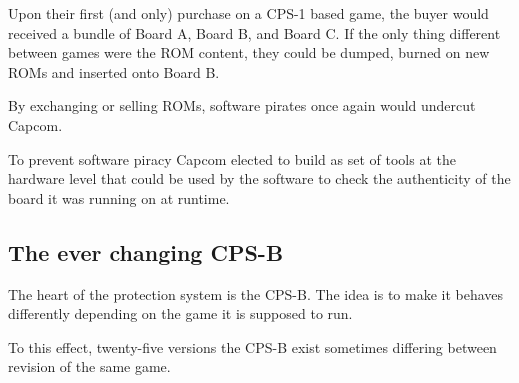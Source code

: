 Upon their first (and only) purchase on a CPS-1 based game, the buyer would received a bundle of Board A, Board B, and Board C. If the only thing different between games were the ROM content, they could be dumped, burned on new ROMs and inserted onto Board B. 

By exchanging or selling ROMs, software pirates once again would undercut Capcom.

To prevent software piracy Capcom elected to build as set of tools at the hardware level that could be used by the software to check the authenticity of the board it was running on at runtime.



\subsection{The ever changing CPS-B}
The heart of the protection system is the CPS-B. The idea is to make it behaves differently depending on the game it is supposed to run.

To this effect, twenty-five versions the CPS-B exist\cite{mame_cps1_video} sometimes differing between revision of the same game\cite{cpsBNumbers}.


